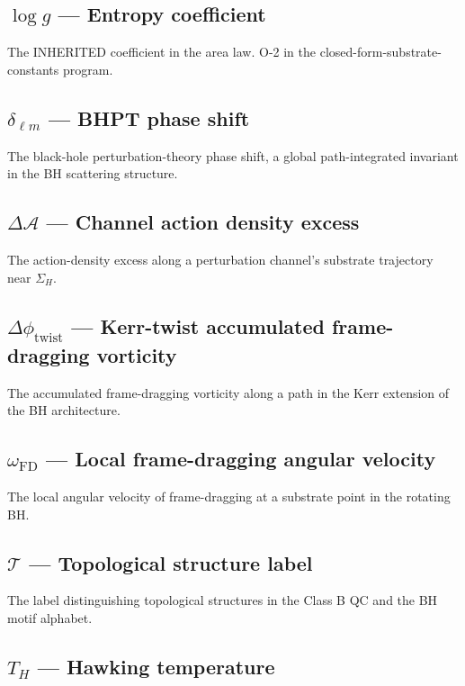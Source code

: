 \documentclass[11pt]{book}
\begin{document}
\subsection{$\log g$ — Entropy coefficient}

The INHERITED coefficient in the area law. O-2 in the closed-form-substrate-constants program.

\subsection{$\delta_{\ell m}$ — BHPT phase shift}

The black-hole perturbation-theory phase shift, a global path-integrated invariant in the BH scattering structure.

\subsection{$\Delta\mathcal{A}$ — Channel action density excess}

The action-density excess along a perturbation channel's substrate trajectory near $\Sigma_H$.

\subsection{$\Delta\phi_\mathrm{twist}$ — Kerr-twist accumulated frame-dragging vorticity}

The accumulated frame-dragging vorticity along a path in the Kerr extension of the BH architecture.

\subsection{$\omega_\mathrm{FD}$ — Local frame-dragging angular velocity}

The local angular velocity of frame-dragging at a substrate point in the rotating BH.

\subsection{$\mathcal{T}$ — Topological structure label}

The label distinguishing topological structures in the Class B QC and the BH motif alphabet.

\subsection{$T_H$ — Hawking temperature}
\end{document}
